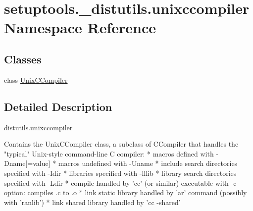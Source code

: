\hypertarget{namespacesetuptools_1_1__distutils_1_1unixccompiler}{}\section{setuptools.\+\_\+distutils.\+unixccompiler Namespace Reference}
\label{namespacesetuptools_1_1__distutils_1_1unixccompiler}
\subsection*{Classes}
\begin{DoxyCompactItemize}
\item 
class \hyperlink{classsetuptools_1_1__distutils_1_1unixccompiler_1_1UnixCCompiler}{Unix\+C\+Compiler}
\end{DoxyCompactItemize}


\subsection{Detailed Description}
\begin{DoxyVerb}distutils.unixccompiler

Contains the UnixCCompiler class, a subclass of CCompiler that handles
the "typical" Unix-style command-line C compiler:
  * macros defined with -Dname[=value]
  * macros undefined with -Uname
  * include search directories specified with -Idir
  * libraries specified with -lllib
  * library search directories specified with -Ldir
  * compile handled by 'cc' (or similar) executable with -c option:
    compiles .c to .o
  * link static library handled by 'ar' command (possibly with 'ranlib')
  * link shared library handled by 'cc -shared'
\end{DoxyVerb}
 